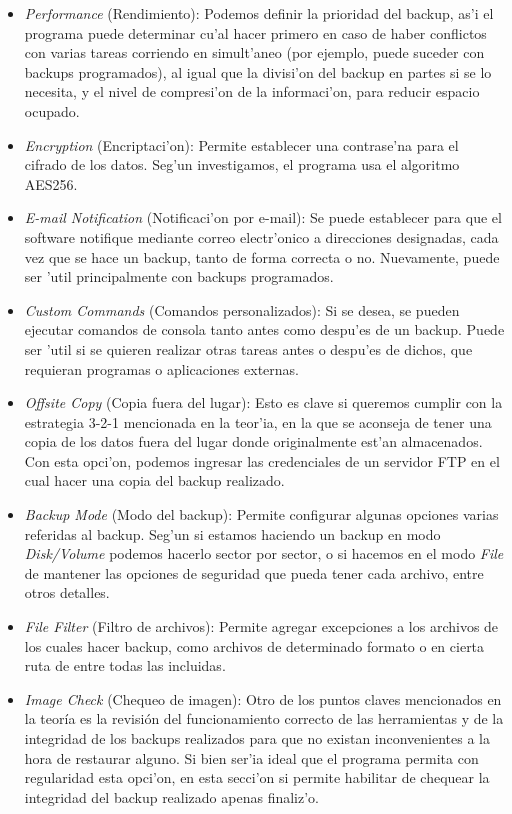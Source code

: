 \documentclass[11pt]{article}
\begin{document}
		\begin{itemize}
			\item \textit{Performance} (Rendimiento): Podemos definir la prioridad del backup, as'i el programa puede determinar cu'al hacer primero en caso de haber conflictos con varias tareas corriendo en simult'aneo (por ejemplo, puede suceder con backups programados), al igual que la divisi'on del backup en partes si se lo necesita, y el nivel de compresi'on de la informaci'on, para reducir espacio ocupado.
			\item \textit{Encryption} (Encriptaci'on): Permite establecer una contrase'na para el cifrado de los datos. Seg'un investigamos, el programa usa el algoritmo AES256.
			\item \textit{E-mail Notification} (Notificaci'on por e-mail): Se puede establecer para que el software notifique mediante correo electr'onico a direcciones designadas, cada vez que se hace un backup, tanto de forma correcta o no. Nuevamente, puede ser 'util principalmente con backups programados.
			\item \textit{Custom Commands} (Comandos personalizados): Si se desea, se pueden ejecutar comandos de consola tanto antes como despu'es de un backup. Puede ser 'util si se quieren realizar otras tareas antes o despu'es de dichos, que requieran programas o aplicaciones externas.
			\item \textit{Offsite Copy} (Copia fuera del lugar): Esto es clave si queremos cumplir con la estrategia 3-2-1 mencionada en la teor'ia, en la que se aconseja de tener una copia de los datos fuera del lugar donde originalmente est'an almacenados. Con esta opci'on, podemos ingresar las credenciales de un servidor FTP en el cual hacer una copia del backup realizado.
			\item \textit{Backup Mode} (Modo del backup): Permite configurar algunas opciones varias referidas al backup. Seg'un si estamos haciendo un backup en modo \textit{Disk/Volume} podemos hacerlo sector por sector, o si hacemos en el modo \textit{File} de mantener las opciones de seguridad que pueda tener cada archivo, entre otros detalles.
			\item \textit{File Filter} (Filtro de archivos): Permite agregar excepciones a los archivos de los cuales hacer backup, como archivos de determinado formato o en cierta ruta de entre todas las incluidas.
			\item \textit{Image Check} (Chequeo de imagen): Otro de los puntos claves mencionados en la teoría es la revisión del funcionamiento correcto de las herramientas y de la integridad de los backups realizados para que no existan inconvenientes a la hora de restaurar alguno. Si bien ser'ia ideal que el programa permita con regularidad esta opci'on, en esta secci'on si permite habilitar de chequear la integridad del backup realizado apenas finaliz'o.
		\end{itemize}
	
\end{document}
